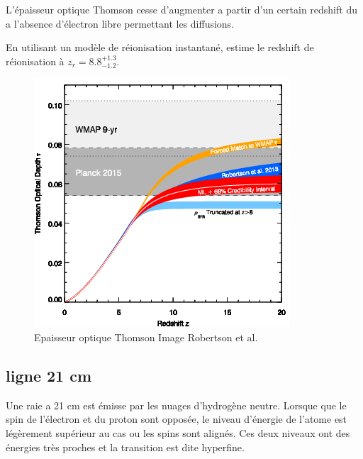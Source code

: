 L'épaisseur optique Thomson cesse d'augmenter a partir d'un certain redshift du a l’absence d'électron libre permettant les diffusions.



En utilisant un modèle de réionisation instantané, \cite{planck_collaboration_planck_2016} estime le redshift de réionisation à $z_r = 8.8 ^{+1.3}_{-1.2}$.

\begin{figure}[bth]
        \includegraphics[width=.95\linewidth]{img/01/epaisseur_optique_thomson.png} 
        \caption{%
		Epaisseur optique Thomson
        Image Robertson et al.}
 		\label{fig:epaisseur_optique_thomson}
\end{figure}




\subsection{ligne 21 cm}

Une raie a 21 cm est émisse par les nuages d'hydrogène neutre.
Lorsque que le spin de l'électron et du proton sont opposée, le niveau d'énergie de l'atome est légèrement supérieur au cas ou les spins sont alignés.
Ces deux niveaux ont des énergies très proches et la transition est dite hyperfine.




